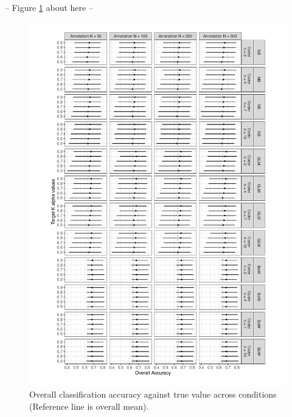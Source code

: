 \documentclass[man, 12pt, a4paper, nolmodern, noextraspace]{apa6}
\begin{document}
\centerline{ -- Figure \ref{fig:Figure1} about here -- }    
    
\begin{figure}
         \captionsetup[figure]{labelfont=bf,textfont=normalfont,singlelinecheck=on}
         \centering
         \includegraphics[trim={0.2cm 0.2cm 0.2cm 0.2cm}, clip, width=\columnwidth]{Results/overall_accuracy.pdf} 
         \captionsetup{format=hang}
         \caption{Overall classification accuracy against true value across conditions (Reference line is overall mean).} 
         \label{fig:Figure1}
\end{figure}    
\end{document}
